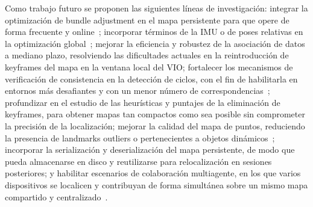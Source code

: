 Como trabajo futuro se proponen las siguientes líneas de investigación: integrar la optimización de bundle adjustment en el mapa persistente para que opere de forma frecuente y online~\cite{campos2021orbslam3}; incorporar términos de la IMU o de poses relativas en la optimización global~\cite{usenko2020basalt, demmel2022slidingrootba}; mejorar la eficiencia y robustez de la asociación de datos a mediano plazo, resolviendo las dificultades actuales en la reintroducción de keyframes del mapa en la ventana local del VIO; fortalecer los mecanismos de verificación de consistencia en la detección de ciclos, con el fin de habilitarla en entornos más desafiantes y con un menor número de correspondencias~\cite{leutenegger2022okvis2}; profundizar en el estudio de las heurísticas y puntajes de la eliminación de keyframes, para obtener mapas tan compactos como sea posible sin comprometer la precisión de la localización; mejorar la calidad del mapa de puntos, reduciendo la presencia de landmarks outliers o pertenecientes a objetos dinámicos~\cite{mur2015orbslam, bescos2018dynaslam}; incorporar la serialización y deserialización del mapa persistente, de modo que pueda almacenarse en disco y reutilizarse para relocalización en sesiones posteriores; y habilitar escenarios de colaboración multiagente, en los que varios dispositivos se localicen y contribuyan de forma simultánea sobre un mismo mapa compartido y centralizado~\cite{schmuk2019ccmslam}.

